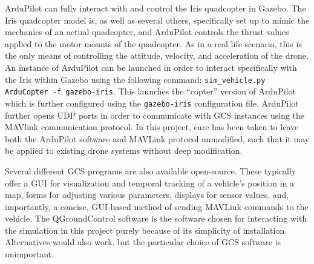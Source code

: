 

ArduPilot can fully interact with and control the Iris quadcopter in Gazebo. The Iris quadcopter model is, as well as several others, specifically set up to mimic the mechanics of an actual quadcopter, and ArduPilot controls the thrust values applied to the motor mounts of the quadcopter. As in a real life scenario, this is the only means of controlling the attitude, velocity, and acceleration of the drone. An instance of ArduPilot can be launched in order to interact specifically with the Iris within Gazebo using the following command: \texttt{sim\_vehicle.py ArduCopter -f gazebo-iris}. This launches the ``copter'' version of ArduPilot which is further configured using the \texttt{gazebo-iris} configuration file. ArduPilot further opens \gls{UDP} ports in order to communicate with \gls{GCS} instances using the MAVlink communication protocol. In this project, care has been taken to leave both the ArduPilot software and MAVLink protocol unmodified, such that it may be applied to existing drone systems without deep modification.

Several different \gls{GCS} programs are also available open-source. These typically offer a GUI for visualization and temporal tracking of a vehicle's position in a map, forms for adjusting various parameters, displays for sensor values, and, importantly, a concise, GUI-based method of sending MAVLink commands to the vehicle. The QGroundControl software \cite{qgroundcontrol} is the software chosen for interacting with the simulation in this project purely because of its simplicity of installation. Alternatives would also work, but the particular choice of \gls{GCS} software is unimportant.